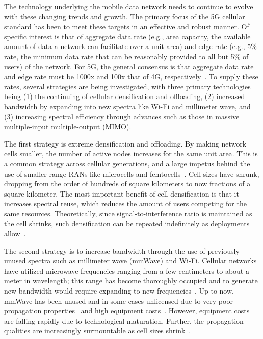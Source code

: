 \documentclass[12pt,dvipsnames]{report}
\begin{document}
The technology underlying the mobile data network needs to continue to evolve with these changing trends and growth.  The primary focus of the 5G cellular standard has been to meet these targets in an effective and robust manner.  Of specific interest is that of aggregate data rate (e.g., area capacity, the available amount of data a network can facilitate over a unit area) and edge rate (e.g., 5\% rate, the minimum data rate that can be reasonably provided to all but 5\% of users) of the network.  For 5G, the general consensus is that aggregate data rate and edge rate must be 1000x and 100x that of 4G, respectively~\cite{6824752}.  To supply these rates, several strategies are being investigated, with three primary technologies being (1) the continuing of cellular densification and offloading, (2) increased bandwidth by expanding into new spectra like Wi-Fi and millimeter wave, and (3) increasing spectral efficiency through advances such as those in massive multiple-input multiple-output (MIMO).

The first strategy is extreme densification and offloading.  By making network cells smaller, the number of active nodes increases for the same unit area.  This is a common strategy across cellular generations, and a large impetus behind the use of smaller range RANs like microcells and femtocells~\cite{4623708}.  Cell sizes have shrunk, dropping from the order of hundreds of square kilometers to now fractions of a square kilometer.  The most important benefit of cell densification is that it increases spectral reuse, which reduces the amount of users competing for the same resources.  Theoretically, since signal-to-interference ratio is maintained as the cell shrinks, such densification can be repeated indefinitely as deployments allow~\cite{6824752, 6171996}.

The second strategy is to increase bandwidth through the use of previously unused spectra such as millimeter wave (mmWave) and Wi-Fi.  Cellular networks have utilized microwave frequencies ranging from a few centimeters to about a meter in wavelength; this range has become thoroughly occupied and to generate new bandwidth would require expanding to new frequencies~\cite{FCC:NationalBroadbandPlan,ITU:M2078}.  Up to now, mmWave has been unused and in some cases unlicensed due to very poor propagation properties~\cite{1491267,5783993} and high equipment costs~\cite{5783993}.  However, equipment costs are falling rapidly due to technological maturation.  Further, the propagation qualities are increasingly surmountable as cell sizes shrink~\cite{6515173}.
\end{document}
